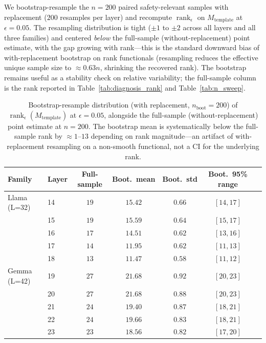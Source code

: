 \documentclass[10pt]{article}
\theoremstyle{definition}
\theoremstyle{remark}
\begin{document}
We bootstrap-resample the $n=200$ paired
safety-relevant samples with replacement ($200$
resamples per layer) and recompute
$\operatorname{rank}_{\epsilon}$ on
$M_{\mathrm{template}}$ at $\epsilon = 0.05$.  The
resampling distribution is tight ($\pm 1$ to $\pm 2$
across all layers and all three families) and centered
\emph{below} the full-sample (without-replacement)
point estimate, with the gap growing with rank---this
is the standard downward bias of with-replacement
bootstrap on rank functionals (resampling reduces the
effective unique sample size to ${\approx}0.63n$,
shrinking the recovered rank).  The bootstrap remains
useful as a stability check on relative variability;
the full-sample column is the rank reported in
Table~\ref{tab:diagnosis_rank} and
Table~\ref{tab:n_sweep}.

\begin{table}[h]\centering
\caption{Bootstrap-resample distribution
(with replacement, $n_{\mathrm{boot}}=200$) of
$\operatorname{rank}_{\epsilon}(M_{\mathrm{template}})$
at $\epsilon=0.05$, alongside the full-sample
(without-replacement) point estimate at $n=200$.  The
bootstrap mean is systematically below the full-sample
rank by ${\approx}1$--$13$ depending on rank
magnitude---an artifact of with-replacement resampling
on a non-smooth functional, not a CI for the underlying
rank.}
\label{tab:bootstrap_ci}
\begin{tabular}{@{}llccccc@{}}
\toprule
Family & Layer & Full-sample & Boot.\ mean & Boot.\ std
       & Boot.\ 95\% range \\
\midrule
Llama (L=32) & 14 & $19$ & $15.42$ & $0.66$ & $[14, 17]$ \\
             & 15 & $19$ & $15.59$ & $0.64$ & $[15, 17]$ \\
             & 16 & $17$ & $14.51$ & $0.62$ & $[13, 16]$ \\
             & 17 & $14$ & $11.95$ & $0.62$ & $[11, 13]$ \\
             & 18 & $13$ & $11.47$ & $0.58$ & $[11, 12]$ \\
\midrule
Gemma (L=42) & 19 & $27$ & $21.68$ & $0.92$ & $[20, 23]$ \\
             & 20 & $27$ & $21.68$ & $0.88$ & $[20, 23]$ \\
             & 21 & $24$ & $19.40$ & $0.87$ & $[18, 21]$ \\
             & 22 & $24$ & $19.66$ & $0.83$ & $[18, 21]$ \\
             & 23 & $23$ & $18.56$ & $0.82$ & $[17, 20]$ \\

\end{tabular}
\end{table}
\end{document}
